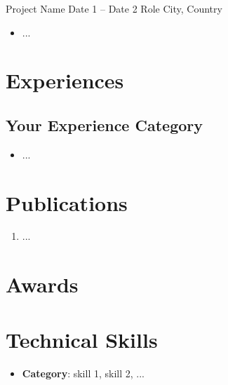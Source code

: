 \documentclass{cv}
\begin{document}
\datedsubsection
{Project Name}
{Date 1 -- Date 2}
{Role}
{City, Country}

\begin{itemize}

\item
...

\end{itemize}


\section{Experiences}

\subsection{Your Experience Category}

\begin{itemize}

\item
...

\end{itemize}


\section{Publications}

\begin{enumerate}

\item
...

\end{enumerate}


\section{Awards}


\section{Technical Skills}

\begin{itemize}

\item
\textbf{Category}: 
skill 1, skill 2, ...

\end{itemize}
\end{document}
